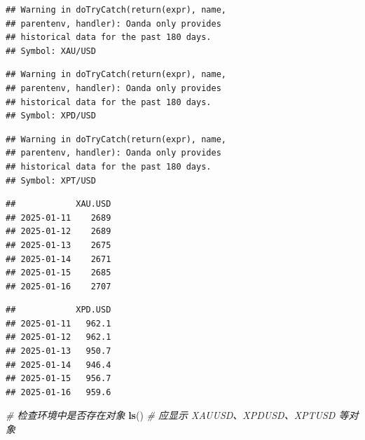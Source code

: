 \documentclass[]{ctexbook}
\newenvironment{Shaded}{\begin{snugshade}}{\end{snugshade}}
\newcommand{\CommentTok}[1]{\textcolor[rgb]{0.56,0.35,0.01}{\textit{#1}}}
\newcommand{\FunctionTok}[1]{\textcolor[rgb]{0.13,0.29,0.53}{\textbf{#1}}}
\newcommand{\NormalTok}[1]{#1}
\newcommand{\OtherTok}[1]{\textcolor[rgb]{0.56,0.35,0.01}{#1}}
\newcommand{\SpecialCharTok}[1]{\textcolor[rgb]{0.81,0.36,0.00}{\textbf{#1}}}
\begin{document}
\begin{verbatim}
## Warning in doTryCatch(return(expr), name,
## parentenv, handler): Oanda only provides
## historical data for the past 180 days.
## Symbol: XAU/USD
\end{verbatim}

\begin{verbatim}
## Warning in doTryCatch(return(expr), name,
## parentenv, handler): Oanda only provides
## historical data for the past 180 days.
## Symbol: XPD/USD
\end{verbatim}

\begin{verbatim}
## Warning in doTryCatch(return(expr), name,
## parentenv, handler): Oanda only provides
## historical data for the past 180 days.
## Symbol: XPT/USD
\end{verbatim}

\begin{Shaded}
\end{Shaded}

\begin{verbatim}
##            XAU.USD
## 2025-01-11    2689
## 2025-01-12    2689
## 2025-01-13    2675
## 2025-01-14    2671
## 2025-01-15    2685
## 2025-01-16    2707
\end{verbatim}

\begin{Shaded}
\end{Shaded}

\begin{verbatim}
##            XPD.USD
## 2025-01-11   962.1
## 2025-01-12   962.1
## 2025-01-13   950.7
## 2025-01-14   946.4
## 2025-01-15   956.7
## 2025-01-16   959.6
\end{verbatim}

\begin{Shaded}
\begin{Highlighting}[]
\CommentTok{\# 检查环境中是否存在对象}
\FunctionTok{ls}\NormalTok{()  }\CommentTok{\# 应显示 XAUUSD、XPDUSD、XPTUSD 等对象}
\end{Highlighting}
\end{Shaded}
\end{document}
